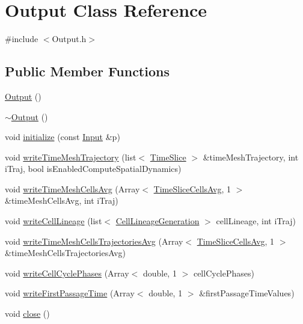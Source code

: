 \hypertarget{class_output}{\section{\-Output \-Class \-Reference}
\label{class_output}
}


{\ttfamily \#include $<$\-Output.\-h$>$}

\subsection*{\-Public \-Member \-Functions}
\begin{DoxyCompactItemize}
\item 
\hyperlink{class_output_a428c663520336477a12f1a33504eb067}{\-Output} ()
\item 
\hyperlink{class_output_a61d0840daf98bea49e4dc471f235eeab}{$\sim$\-Output} ()
\item 
void \hyperlink{class_output_a656d3b4d04355381c544851ced239100}{initialize} (const \hyperlink{class_input}{\-Input} \&p)
\item 
void \hyperlink{class_output_a77417156c6f8d8488d4d4ef4f908195f}{write\-Time\-Mesh\-Trajectory} (list$<$ \hyperlink{class_time_slice}{\-Time\-Slice} $>$ \&time\-Mesh\-Trajectory, int i\-Traj, bool is\-Enabled\-Compute\-Spatial\-Dynamics)
\item 
void \hyperlink{class_output_a83c90262752ea2e4b25a54779d4dc754}{write\-Time\-Mesh\-Cells\-Avg} (\-Array$<$ \hyperlink{class_time_slice_cells_avg}{\-Time\-Slice\-Cells\-Avg}, 1 $>$ \&time\-Mesh\-Cells\-Avg, int i\-Traj)
\item 
void \hyperlink{class_output_a16624e8c9b13271f7ace2bbb217430db}{write\-Cell\-Lineage} (list$<$ \hyperlink{class_cell_lineage_generation}{\-Cell\-Lineage\-Generation} $>$ cell\-Lineage, int i\-Traj)
\item 
void \hyperlink{class_output_a8daec3ace3c03412d627af6f791332e2}{write\-Time\-Mesh\-Cells\-Trajectories\-Avg} (\-Array$<$ \hyperlink{class_time_slice_cells_avg}{\-Time\-Slice\-Cells\-Avg}, 1 $>$ \&time\-Mesh\-Cells\-Trajectories\-Avg)
\item 
void \hyperlink{class_output_a74bd96aeaab227064791019cfaa1c7ef}{write\-Cell\-Cycle\-Phases} (\-Array$<$ double, 1 $>$ cell\-Cycle\-Phases)
\item 
void \hyperlink{class_output_a6312626943f77b1dc780b60e2b476bbd}{write\-First\-Passage\-Time} (\-Array$<$ double, 1 $>$ \&first\-Passage\-Time\-Values)
\item 
void \hyperlink{class_output_a8ad983d5d1526a180e3a9cdb005b4198}{close} ()
\end{DoxyCompactItemize}


